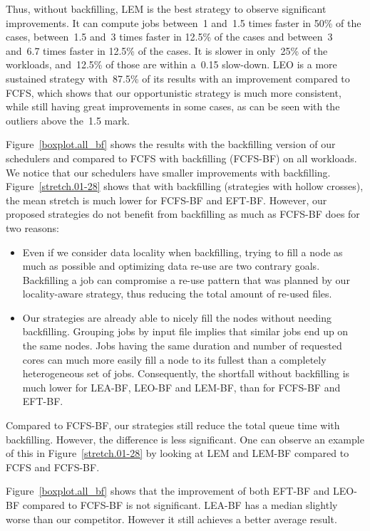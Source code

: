 \documentclass[conference,10pt]{IEEEtran}
\begin{document}
Thus, without backfilling, LEM is the best strategy to observe significant improvements.
It can compute jobs between~1 and~1.5 times faster in 50\% of the cases,
between~1.5 and~3 times faster in 12.5\% of the cases and between~3 and~6.7 times faster in 12.5\% of the cases.
It is slower in only~25\% of the workloads, and~12.5\% of those are within a~0.15 slow-down.
LEO is a more sustained strategy with~87.5\% of its results with an improvement compared to FCFS, which shows that our opportunistic
strategy is much more consistent, while still having great improvements in some cases, as can be seen with the outliers above the~1.5 mark.

Figure~\ref{boxplot.all_bf} shows the results with the backfilling version of our
schedulers and compared to FCFS with backfilling (FCFS-BF) on all workloads.
We  notice that our schedulers  have smaller improvements with backfilling.
Figure~\ref{stretch.01-28} shows that
with backfilling 
(strategies with hollow crosses),
the mean stretch is much lower for FCFS-BF and EFT-BF. 
However, our proposed strategies do not benefit from backfilling as much as FCFS-BF does for two reasons:
\begin{itemize}
	\item Even if we consider data locality when backfilling, trying to fill a node as much as possible and optimizing data re-use are two contrary goals. 
	Backfilling a job can compromise a re-use pattern that was planned by our locality-aware strategy, thus reducing the total 
	amount of re-used files.
	\item Our strategies are already able to nicely fill the nodes without needing backfilling.
	Grouping jobs by input file implies that similar jobs end up on the same nodes.
	Jobs having the same duration and number of requested cores can much more easily fill a node to its fullest than a completely heterogeneous set of jobs.
	Consequently, the shortfall without backfilling is much lower for LEA-BF, LEO-BF and LEM-BF, than for FCFS-BF and EFT-BF.
\end{itemize}
Compared to FCFS-BF, our strategies still reduce the total queue time with backfilling.
However, the difference is less significant. One can observe an example of this
in Figure~\ref{stretch.01-28} by looking at LEM and LEM-BF compared to FCFS and FCFS-BF.

Figure~\ref{boxplot.all_bf} shows that the improvement of both EFT-BF and LEO-BF compared to FCFS-BF is not significant.
LEA-BF has a median slightly worse than our competitor. However it still achieves a better average result.
\end{document}
